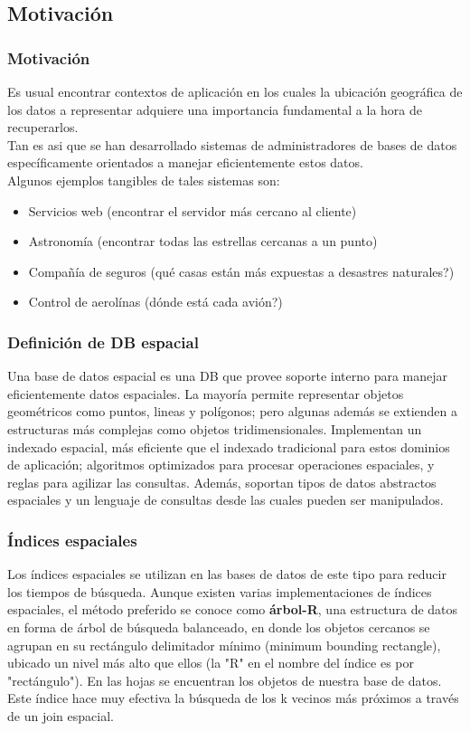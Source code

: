 
\subsection{Motivación}

\begin{frame}
		\frametitle{Motivación}
		Es usual encontrar contextos de aplicación en los cuales la ubicación geográfica de los datos a representar adquiere una importancia fundamental a la hora de recuperarlos. \pause \\
		Tan es asi que se han desarrollado sistemas de administradores de bases de datos específicamente orientados a manejar eficientemente estos datos. \pause \\
		Algunos ejemplos tangibles de tales sistemas son:
		\begin{itemize}
				\item	Servicios web (encontrar el servidor más cercano al cliente) \pause
				\item	Astronomía (encontrar todas las estrellas cercanas a un punto) \pause
				\item	Compañía de seguros (qué casas están más expuestas a desastres naturales?) \pause
				\item	Control de aerolínas (dónde está cada avión?)
		\end{itemize}
\end{frame}

\begin{frame}
		\frametitle{Definición de DB espacial}
		Una base de datos espacial es una DB que provee soporte interno para manejar eficientemente datos espaciales. \pause
		La mayoría permite representar objetos geométricos como puntos, lineas y polígonos; pero algunas además se extienden a estructuras más complejas como objetos tridimensionales. \pause
		Implementan un indexado espacial, más eficiente que el indexado tradicional para estos dominios de aplicación; algoritmos optimizados para procesar operaciones espaciales, y reglas para agilizar las consultas. \pause
		Además, soportan tipos de datos abstractos espaciales y un lenguaje de consultas desde las cuales pueden ser manipulados.
\end{frame}

\begin{frame}
		\frametitle{Índices espaciales}
		Los índices espaciales se utilizan en las bases de datos de este tipo para reducir los tiempos de búsqueda. \pause
		Aunque existen varias implementaciones de índices espaciales, el método preferido se conoce como {\bf árbol-R}, una estructura de datos en forma de árbol de búsqueda balanceado, en donde los objetos cercanos se agrupan en su rectángulo delimitador mínimo (minimum bounding rectangle), ubicado un nivel más alto que ellos (la "R" en el nombre del índice es por "rectángulo"). \pause
		En las hojas se encuentran los objetos de nuestra base de datos. \pause
		Este índice hace muy efectiva la búsqueda de los k vecinos más próximos a través de un join espacial.
\end{frame}

